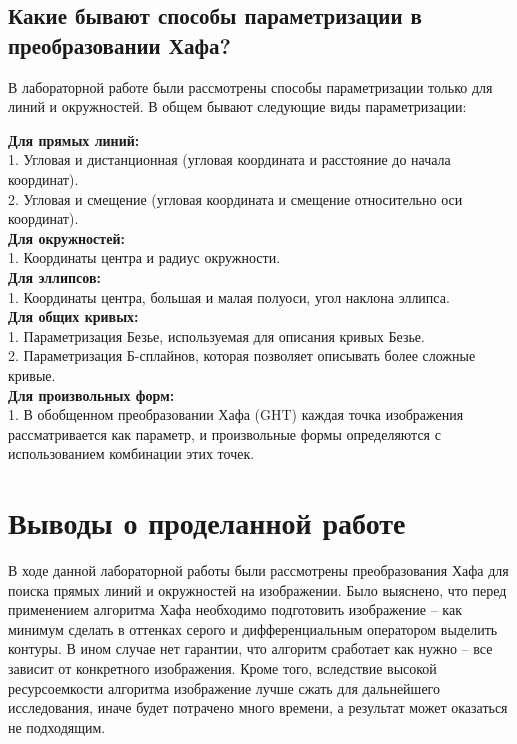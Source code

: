 \documentclass[a4paper, 16pt]{article}
\begin{document}
    \subsection{Какие бывают способы параметризации в преобразовании Хафа?}
    \noindent В лабораторной работе были рассмотрены способы параметризации только для линий и окружностей.
    В общем бывают следующие виды параметризации:
    \begin{center}
        \textbf{Для прямых линий:}\\
        1. Угловая и дистанционная (угловая координата и расстояние до начала координат).\\
        2. Угловая и смещение (угловая координата и смещение относительно оси координат).\\
        \textbf{Для окружностей:}\\
        1. Координаты центра и радиус окружности.\\
        \textbf{Для эллипсов:}\\
        1. Координаты центра, большая и малая полуоси, угол наклона эллипса.\\
        \textbf{Для общих кривых:}\\
        1. Параметризация Безье, используемая для описания кривых Безье.\\
        2. Параметризация Б-сплайнов, которая позволяет описывать более сложные кривые.\\
        \textbf{Для произвольных форм:}\\
        1. В обобщенном преобразовании Хафа (GHT) каждая точка изображения рассматривается как параметр,
        и произвольные формы определяются с использованием комбинации этих точек.
    \end{center}

    \section{Выводы о проделанной работе}
    \noindent В ходе данной лабораторной работы были рассмотрены преобразования Хафа для поиска прямых линий и
    окружностей на изображении. Было выяснено, что перед применением алгоритма Хафа необходимо подготовить изображение --
    как минимум сделать в оттенках серого и дифференциальным оператором выделить контуры. В ином случае нет гарантии, что
    алгоритм сработает как нужно -- все зависит от конкретного изображения. Кроме того, вследствие высокой ресурсоемкости
    алгоритма изображение лучше сжать для дальнейшего исследования, иначе будет потрачено много времени, а результат может
    оказаться не подходящим.
\end{document}
